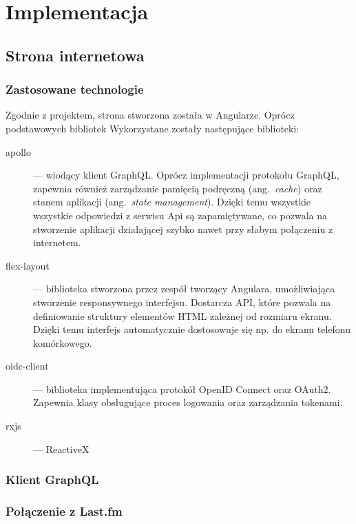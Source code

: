 \chapter{Implementacja}
\label{sec:implementacja}

\section{Strona internetowa}
	\subsection{Zastosowane technologie}
		Zgodnie z projektem, strona stworzona została w Angularze.
		Oprócz podstawowych bibliotek Wykorzystane zostały następujące biblioteki:
		\begin{description}
			\item[apollo] --- wiodący klient GraphQL. Oprócz implementacji protokołu GraphQL,
			zapewnia również zarządzanie pamięcią podręczną (ang.\ \emph{cache}) oraz stanem aplikacji (ang.\ \emph{state management}).
			Dzięki temu wszystkie wszystkie odpowiedzi z serwisu Api są zapamiętywane,
			co pozwala na stworzenie aplikacji działającej szybko nawet przy słabym połączeniu z internetem.
			
			\item[flex-layout] --- biblioteka stworzona przez zespół tworzący Angulara, umożliwiająca stworzenie responsywnego interfejsu.
				Dostarcza API, które pozwala na definiowanie struktury elementów HTML zależnej od rozmiaru ekranu.
				Dzięki temu interfejs automatycznie dostosowuje się np. do ekranu telefonu komórkowego.
			
			\item[oidc-client] --- biblioteka implementująca protokół OpenID Connect oraz OAuth2.
				Zapewnia klasy obsługujące proces logowania oraz zarządzania tokenami.

			\item[rxjs] --- ReactiveX 

		\end{description}

	\subsection{Klient GraphQL}

	\subsection{Połączenie z Last.fm}


